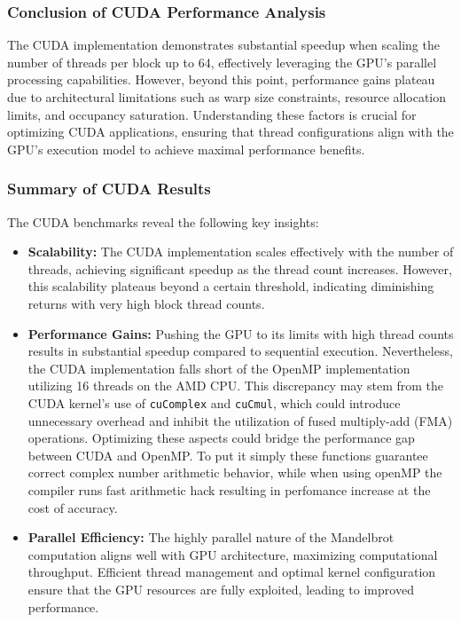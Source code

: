 \documentclass[
	report, %
	11pt, %
]{CSUniSchoolLabReport}
\newcounter{ct}
\begin{document}
\subsubsection{Conclusion of CUDA Performance Analysis}

The CUDA implementation demonstrates substantial speedup when scaling the number of threads per block up to 64, effectively leveraging the GPU's parallel processing capabilities. However, beyond this point, performance gains plateau due to architectural limitations such as warp size constraints, resource allocation limits, and occupancy saturation. Understanding these factors is crucial for optimizing CUDA applications, ensuring that thread configurations align with the GPU's execution model to achieve maximal performance benefits.

\subsubsection{Summary of CUDA Results}

The CUDA benchmarks reveal the following key insights:

\begin{itemize}
	\item \textbf{Scalability:} The CUDA implementation scales effectively with the number of threads, achieving significant speedup as the thread count increases. However, this scalability plateaus beyond a certain threshold, indicating diminishing returns with very high block thread counts.

	\item \textbf{Performance Gains:} Pushing the GPU to its limits with high thread counts results in substantial speedup compared to sequential execution. Nevertheless, the CUDA implementation falls short of the OpenMP implementation utilizing 16 threads on the AMD CPU. This discrepancy may stem from the CUDA kernel's use of \texttt{cuComplex} and \texttt{cuCmul}, which could introduce unnecessary overhead and inhibit the utilization of fused multiply-add (FMA) operations. Optimizing these aspects could bridge the performance gap between CUDA and OpenMP. To put it simply these functions guarantee correct complex number arithmetic behavior, while when using openMP the compiler runs fast arithmetic hack resulting in perfomance increase at the cost of accuracy.

	\item \textbf{Parallel Efficiency:} The highly parallel nature of the Mandelbrot computation aligns well with GPU architecture, maximizing computational throughput. Efficient thread management and optimal kernel configuration ensure that the GPU resources are fully exploited, leading to improved performance.
\end{itemize}
\end{document}
